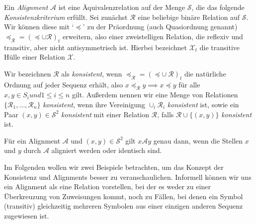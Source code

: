 \begin{definition}
	Ein \emph{Alignment} $\mathcal{A}$ ist eine Äquivalenzrelation auf der Menge $\mathcal{S}$, die das folgende \emph{Konsistenzkriterium} erfüllt. Sei zunächst $\mathcal{R}$ eine beliebige binäre Relation auf $\mathcal{S}$. Wir können diese mit `$\preceq$' zu der Präordnung (auch Quasiordnung genannt) $\preceq_{\mathcal{R}}=(\preceq \cup \mathcal{R})_t$ erweitern, also einer zweistelligen Relation, die reflexiv und transitiv, aber nicht antisymmetrisch ist. Hierbei bezeichnet $\mathcal{X}_t$ die transitive Hülle einer Relation $\mathcal{X}$. 
	
	Wir bezeichnen $\mathcal{R}$ als \emph{konsistent}, wenn $\preceq_{\mathcal{R}}=(\preceq \cup\: \mathcal{R})_t$ die natürliche Ordnung auf jeder Sequenz erhält, also $x \preceq_{\mathcal{R}} y \implies x \preceq y$ für alle $x,y \in S_i und 1\leq i\leq n$ gilt. Außerdem nennen wir eine Menge von Relationen $\{\mathcal{R}_1, \dots, \mathcal{R}_n\}$ \emph{konsistent}, wenn ihre Vereinigung $\cup_i \mathcal{R}_i$ \emph{konsistent} ist, sowie ein Paar $(x,y) \in \mathcal{S}^2$ \emph{konsistent} mit einer Relation $\mathcal{R}$, falls $\mathcal{R} \cup \{(x,y)\}$ \emph{konsistent} ist.
	
	Für ein Alignment $\mathcal{A}$ und $(x,y) \in \mathcal{S}^2$ gilt $x\mathcal{A}y$ genau dann, wenn die Stellen $x$ und $y$ durch $\mathcal{A}$ aligniert werden oder identisch sind.
\end{definition}

Im Folgenden wollen wir zwei Beispiele betrachten, um das Konzept der Konsistenz und Alignments besser zu veranschaulichen. Informell können wir uns ein Alignment als eine Relation vorstellen, bei der es weder zu einer Überkreuzung von Zuweisungen kommt, noch zu Fällen, bei denen ein Symbol (transitiv) gleichzeitig mehreren Symbolen aus einer einzigen anderen Sequenz zugewiesen ist.

